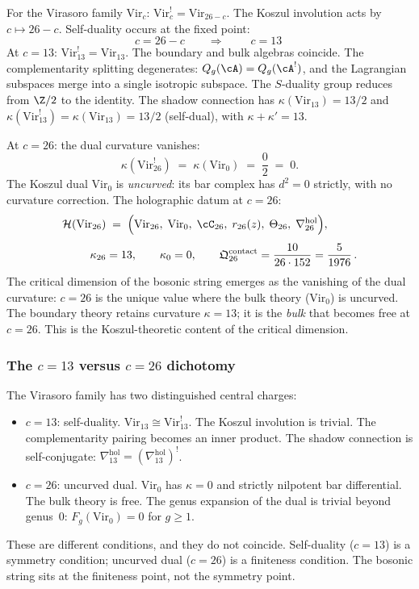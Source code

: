For the Virasoro family $\mathrm{Vir}_c$:
$\mathrm{Vir}_c^!=\mathrm{Vir}_{26-c}$. The Koszul involution
acts by $c\mapsto 26-c$. Self-duality occurs at the fixed point:
\[
c=26-c
\qquad\Longrightarrow\qquad
\boxed{\;c=13\;}
\]
At $c=13$: $\mathrm{Vir}_{13}^!=\mathrm{Vir}_{13}$. The
boundary and bulk algebras coincide. The complementarity
splitting degenerates: $Q_g(\cA)=Q_g(\cA^!)$, and the Lagrangian
subspaces merge into a single isotropic subspace. The
$S$-duality group reduces from $\Z/2$ to the identity. The
shadow connection has $\kappa(\mathrm{Vir}_{13})=13/2$
and $\kappa(\mathrm{Vir}_{13}^!)=\kappa(\mathrm{Vir}_{13})=13/2$
\textup{(}self-dual\textup{)}, with
$\kappa+\kappa'=13$.

At $c=26$: the dual curvature vanishes:
\[
\kappa(\mathrm{Vir}_{26}^!)
\;=\;\kappa(\mathrm{Vir}_0)
\;=\;\frac{0}{2}\;=\;0.
\]
The Koszul dual $\mathrm{Vir}_0$ is \emph{uncurved}: its bar
complex has $d^2=0$ strictly, with no curvature correction.
The holographic datum at $c=26$:
\begin{align*}
\mathcal H(\mathrm{Vir}_{26})
&\;=\;
\Bigl(
\mathrm{Vir}_{26},\;
\mathrm{Vir}_0,\;
\cC_{26},\;r_{26}(z),\;\Theta_{26},\;\nabla^{\mathrm{hol}}_{26}
\Bigr),\\[4pt]
\kappa_{26}&=13,
\qquad
\kappa_0=0,
\qquad
\mathfrak Q^{\mathrm{contact}}_{26}
=\frac{10}{26\cdot 152}=\frac{5}{1976}\,.
\end{align*}
The critical dimension of the bosonic string emerges as the
vanishing of the dual curvature: $c=26$ is the unique value
where the bulk theory ($\mathrm{Vir}_0$) is uncurved. The
boundary theory retains curvature $\kappa=13$; it is the
\emph{bulk} that becomes free at $c=26$. This is the
Koszul-theoretic content of the critical dimension.

\subsubsection*{The $c=13$ versus $c=26$ dichotomy}

The Virasoro family has two distinguished central charges:
\begin{itemize}
\item $c=13$: self-duality.
 $\mathrm{Vir}_{13}\cong\mathrm{Vir}_{13}^!$. The Koszul
 involution is trivial. The complementarity pairing becomes
 an inner product. The shadow connection is
 self-conjugate: $\nabla^{\mathrm{hol}}_{13}
 =(\nabla^{\mathrm{hol}}_{13})^!$.
\item $c=26$: uncurved dual.
 $\mathrm{Vir}_0$ has $\kappa=0$ and strictly nilpotent bar
 differential. The bulk theory is free. The genus expansion
 of the dual is trivial beyond genus~$0$: $F_g(\mathrm{Vir}_0)
 =0$ for $g\ge 1$.
\end{itemize}
These are different conditions, and they do not coincide.
Self-duality ($c=13$) is a symmetry condition; uncurved dual
($c=26$) is a finiteness condition. The bosonic string sits at
the finiteness point, not the symmetry point.


